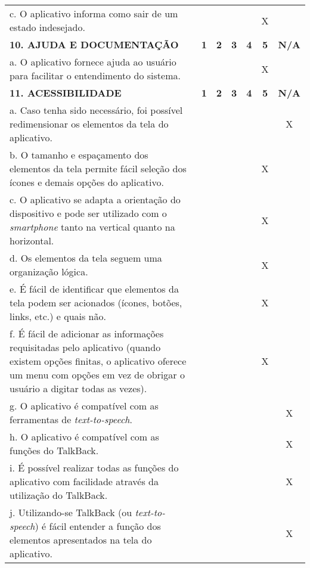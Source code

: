 \documentclass[portuguese,oneside]{tcc}
\begin{document}
\begin{center}
\begin{longtabu}{|L{25em}|c|c|c|c|c|c|}
																						c. O aplicativo informa como sair de um estado indesejado. & & & & & X & \\ 
																						\textbf{10. AJUDA E DOCUMENTAÇÃO} & \textbf{1} & \textbf{2} & \textbf{3} & \textbf{4} & \textbf{5} & \textbf{N/A} \\ 
																						a. O aplicativo fornece ajuda ao usuário para facilitar o entendimento do sistema. & & & & & X & \\ 
																						\textbf{11. ACESSIBILIDADE} & \textbf{1} & \textbf{2} & \textbf{3} & \textbf{4} & \textbf{5} & \textbf{N/A} \\ 
																						a. Caso tenha sido necessário, foi possível redimensionar os elementos da tela do aplicativo. & & & & & & X \\ 
																						b. O tamanho e espaçamento dos elementos da tela permite fácil seleção dos ícones e demais opções do aplicativo. & & & & & X & \\ 
																						c. O aplicativo se adapta a orientação do dispositivo e pode ser utilizado com o \emph{smartphone} tanto na vertical quanto na horizontal. & & & & & X & \\ 
																						d. Os elementos da tela seguem uma organização lógica. & & & & & X & \\ 
																						e. É fácil de identificar que elementos da tela podem ser acionados (ícones, botões, links, etc.) e quais não. & & & & & X & \\ 
																						f. É fácil de adicionar as informações requisitadas pelo aplicativo (quando existem opções finitas, o aplicativo oferece um menu com opções em vez de obrigar o usuário a digitar todas as vezes). & & & & & X & \\ 
																						g. O aplicativo é compatível com as ferramentas de \emph{text-to-speech}. & & & & & & X \\ 
																						h. O aplicativo é compatível com as funções do TalkBack. & & & & & & X \\ 
																						i. É possível realizar todas as funções do aplicativo com facilidade através da utilização do TalkBack.	& & & & & & X \\ 
																						j. Utilizando-se TalkBack (ou \emph{text-to-speech}) é fácil entender a função dos elementos apresentados na tela do aplicativo. & & & & & & X \\ 

\end{longtabu}
\end{center}
\end{document}
